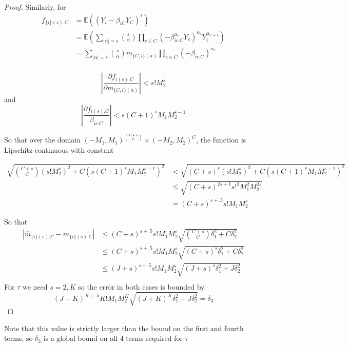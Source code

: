 \documentclass[]{article}
\newcommand{\E}{\mathbb{E}}
\begin{document}
\begin{proof}

Similarly, for
\begin{equation}
\begin{aligned}
f_{\{i\}(s).C} &= \E\left((Y_i - \beta_{iC}Y_C)^s\right)
\\
&= \E\left(\sum_{|\alpha| = s} {s \choose \alpha} \prod_{c \in C}(-\beta_{ic.C}^{\alpha_c}Y_c)^{\alpha_c} Y_i^{\alpha_{C+1}}\right)\\
&= \sum_{|\alpha| = s} {s \choose \alpha} m_{\{C,i\}(\alpha)} \prod_{c \in C}(-\beta_{ic.C})^{\alpha_c}\\
\end{aligned}
\end{equation}


\[\left|\frac{\partial f_{i(s).C}}{\partial m_{\{C,i\}(\alpha)}} \right| < s! M_2^{s}\]
and
\[\left|\frac{\partial f_{i(s).C}}{\beta_{ic.C}} \right| < s(C+1)^s M_1 M_2^{s-1} \]

So that over the domain $(-M_1, M_1)^{{C + s \choose C}} \times (-M_2, M_2)^{C}$, the function is Lipschitz continuous with constant

\begin{equation}
\begin{aligned}
\sqrt{{C + s \choose C} \left(s! M_2^s\right)^2 + C\left(s(C+1)^s M_1 M_2^{s-1}\right)^2} &< \sqrt{(C+s)^s\left(s!M_2^s\right)^2 + C\left(s(C+1)^s M_1 M_2^{s-1}\right)^2}
\\
& \leq \sqrt{(C+s)^{2s+1}s!^2M_1^2M_2^{2s}}\\
& = (C+s)^{s + .5}s!M_1M_2^s
\end{aligned}
\end{equation}

So that
\begin{equation}
\begin{aligned}
|\hat m_{\{i\}(s).C} - m_{\{i\}(s).C}| &\leq (C+s)^{s + .5}s!M_1M_2^s \sqrt{{C + s \choose C}\delta_1^2 + C\delta_2^2}
\\
& \leq (C+s)^{s + .5}s!M_1M_2^s \sqrt{(C+s)^s\delta_1^2 + C \delta_2^2}\\
& \leq (J+s)^{s + .5}s!M_1M_2^s \sqrt{(J + s)^s\delta_1^2 + J \delta_2^2}\\
\end{aligned}
\end{equation}
For $\tau$ we need $s = 2, K$ so the error in both cases is bounded by
\[(J +K)^{K + .5}K!M_1M_2^K \sqrt{(J+K)^K\delta_1^2 + J \delta_2^2} = \delta_3\]

\end{proof}
Note that this value is strictly larger than the bound on the first and fourth terms, so $\delta_3$ is a global bound on all 4 terms required for $\tau$
\end{document}
